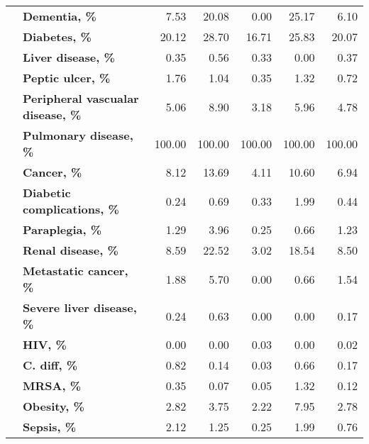 \begin{tabular}{llrrrrr}
               & \textbf{Dementia, \%} &    7.53 &   20.08 &    0.00 &   25.17 &              6.10 \\
               & \textbf{Diabetes, \%} &   20.12 &   28.70 &   16.71 &   25.83 &             20.07 \\
               & \textbf{Liver disease, \%} &    0.35 &    0.56 &    0.33 &    0.00 &              0.37 \\
               & \textbf{Peptic ulcer, \%} &    1.76 &    1.04 &    0.35 &    1.32 &              0.72 \\
               & \textbf{Peripheral vascualar disease, \%} &    5.06 &    8.90 &    3.18 &    5.96 &              4.78 \\
               & \textbf{Pulmonary disease, \%} &  100.00 &  100.00 &  100.00 &  100.00 &            100.00 \\
               & \textbf{Cancer, \%} &    8.12 &   13.69 &    4.11 &   10.60 &              6.94 \\
               & \textbf{Diabetic complications, \%} &    0.24 &    0.69 &    0.33 &    1.99 &              0.44 \\
               & \textbf{Paraplegia, \%} &    1.29 &    3.96 &    0.25 &    0.66 &              1.23 \\
               & \textbf{Renal disease, \%} &    8.59 &   22.52 &    3.02 &   18.54 &              8.50 \\
               & \textbf{Metastatic cancer, \%} &    1.88 &    5.70 &    0.00 &    0.66 &              1.54 \\
               & \textbf{Severe liver disease, \%} &    0.24 &    0.63 &    0.00 &    0.00 &              0.17 \\
               & \textbf{HIV, \%} &    0.00 &    0.00 &    0.03 &    0.00 &              0.02 \\
               & \textbf{C. diff, \%} &    0.82 &    0.14 &    0.03 &    0.66 &              0.17 \\
               & \textbf{MRSA, \%} &    0.35 &    0.07 &    0.05 &    1.32 &              0.12 \\
               & \textbf{Obesity, \%} &    2.82 &    3.75 &    2.22 &    7.95 &              2.78 \\
               & \textbf{Sepsis, \%} &    2.12 &    1.25 &    0.25 &    1.99 &              0.76 \\
\bottomrule
\end{tabular}
